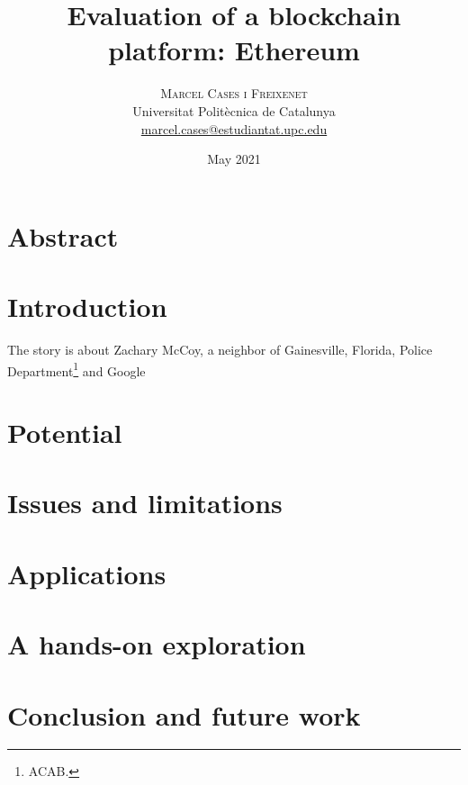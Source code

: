 \documentclass[11pt]{article}
\begin{document}
\title{%
	\huge\bfseries Evaluation of a blockchain platform: Ethereum \\
}
\date{May 2021}
\author{
	{\scshape Marcel Cases i Freixenet} \\
	{\small Universitat Politècnica de Catalunya} \\
	{\small\href{mailto:marcel.cases@estudiantat.upc.edu}{marcel.cases@estudiantat.upc.edu}}
}

\maketitle

\begin{multicols}{2}
	
\section*{Abstract}

\section{Introduction}

The story is about Zachary McCoy, a neighbor of Gainesville, Florida\cite{ref:mccoy}, Police Department\footnote{ACAB.} and Google

\section{Potential}

\section{Issues and limitations}

\section{Applications}

\section{A hands-on exploration}

\section{Conclusion and future work}

\begin{thebibliography}{100}


\end{thebibliography}
\end{multicols}
\end{document}
